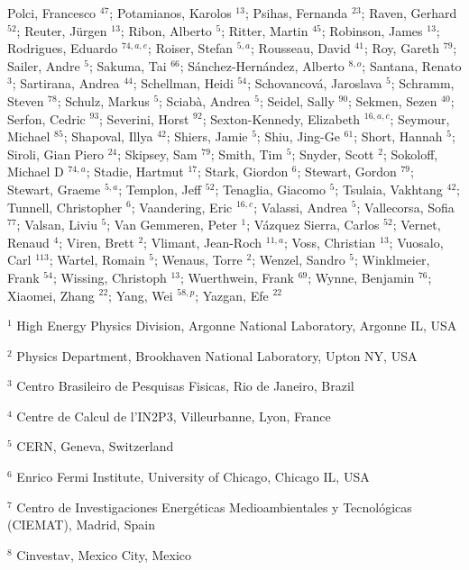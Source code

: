 Polci, Francesco $^{47}$;
Potamianos, Karolos $^{13}$;
Psihas, Fernanda $^{23}$;
Raven, Gerhard $^{52}$;
Reuter, Jürgen $^{13}$;
Ribon, Alberto $^{5}$;
Ritter, Martin $^{45}$;
Robinson, James $^{13}$;
Rodrigues, Eduardo $^{74,a,e}$;
Roiser, Stefan $^{5,a}$;
Rousseau, David $^{41}$;
Roy, Gareth $^{79}$;
Sailer, Andre $^{5}$;
Sakuma, Tai $^{66}$;
Sánchez-Hernández, Alberto $^{8,o}$;
Santana, Renato $^{3}$;
Sartirana, Andrea $^{44}$;
Schellman, Heidi $^{54}$;
Schovancová, Jaroslava $^{5}$;
Schramm, Steven $^{78}$;
Schulz, Markus $^{5}$;
Sciabà, Andrea $^{5}$;
Seidel, Sally $^{90}$;
Sekmen, Sezen $^{40}$;
Serfon, Cedric $^{93}$;
Severini, Horst $^{92}$;
Sexton-Kennedy, Elizabeth $^{16,a,c}$;
Seymour, Michael $^{85}$;
Shapoval, Illya $^{42}$;
Shiers, Jamie $^{5}$;
Shiu, Jing-Ge $^{61}$;
Short, Hannah $^{5}$;
Siroli, Gian Piero $^{24}$;
Skipsey, Sam $^{79}$;
Smith, Tim $^{5}$;
Snyder, Scott $^{2}$;
Sokoloff, Michael D $^{74,a}$;
Stadie, Hartmut $^{17}$;
Stark, Giordon $^{6}$;
Stewart, Gordon $^{79}$;
Stewart, Graeme $^{5,a}$;
Templon, Jeff $^{52}$;
Tenaglia, Giacomo $^{5}$;
Tsulaia, Vakhtang $^{42}$;
Tunnell, Christopher $^{6}$;
Vaandering, Eric $^{16,c}$;
Valassi, Andrea $^{5}$;
Vallecorsa, Sofia $^{77}$;
Valsan, Liviu $^{5}$;
Van Gemmeren, Peter $^{1}$;
Vázquez Sierra, Carlos $^{52}$;
Vernet, Renaud $^{4}$;
Viren, Brett $^{2}$;
Vlimant, Jean-Roch $^{11,a}$;
Voss, Christian $^{13}$;
Vuosalo, Carl $^{113}$;
Wartel, Romain $^{5}$;
Wenaus, Torre $^{2}$;
Wenzel, Sandro $^{5}$;
Winklmeier, Frank $^{54}$;
Wissing, Christoph $^{13}$;
Wuerthwein, Frank $^{69}$;
Wynne, Benjamin $^{76}$;
Xiaomei, Zhang $^{22}$;
Yang, Wei $^{58,p}$;
Yazgan, Efe $^{22}$
\bigskip
\par {\footnotesize $^{1}$ High Energy Physics Division, Argonne National Laboratory, Argonne IL, USA}
\par {\footnotesize $^{2}$ Physics Department, Brookhaven National Laboratory, Upton NY, USA}
\par {\footnotesize $^{3}$ Centro Brasileiro de Pesquisas Fisicas, Rio de Janeiro, Brazil}
\par {\footnotesize $^{4}$ Centre de Calcul de l’IN2P3, Villeurbanne, Lyon, France}
\par {\footnotesize $^{5}$ CERN, Geneva, Switzerland}
\par {\footnotesize $^{6}$ Enrico Fermi Institute, University of Chicago, Chicago IL, USA}
\par {\footnotesize $^{7}$ Centro de Investigaciones Energéticas Medioambientales y Tecnológicas (CIEMAT), Madrid, Spain}
\par {\footnotesize $^{8}$ Cinvestav, Mexico City, Mexico}
